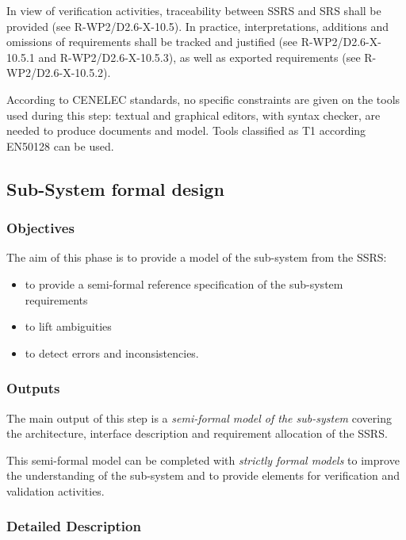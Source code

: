 In view of verification activities, traceability between SSRS and SRS shall be provided (see R-WP2/D2.6-X-10.5). In practice, interpretations, additions and omissions of requirements shall be tracked and justified (see R-WP2/D2.6-X-10.5.1 and R-WP2/D2.6-X-10.5.3), as well as exported requirements  (see R-WP2/D2.6-X-10.5.2).

According to  CENELEC standards, no specific constraints are given on the tools used during this step: textual and graphical editors, with syntax checker, are needed to  produce documents and model. Tools classified as T1 according EN50128 can be used.


\subsection{Sub-System formal design}
\label{sec:subsyst-formal-design}



\subsubsection{Objectives}
\label{sec:sys-fm-objective}

The aim of this phase is to provide a model of the sub-system from the SSRS:

\begin{itemize}
\item to provide a semi-formal reference specification of the sub-system requirements
\item to lift ambiguities
\item to detect errors and inconsistencies.
\end{itemize}


\subsubsection{Outputs}
\label{sec:sys-fm-outputs}


The main output of this step is a \textit{semi-formal model of the sub-system}  covering the architecture, interface description and requirement allocation of the SSRS.

This semi-formal model can be completed with \textit{strictly formal models} to improve the understanding of the sub-system and to provide elements for verification and validation activities.

\subsubsection{Detailed Description}
\label{sec:sys-dev-deta-descr}


